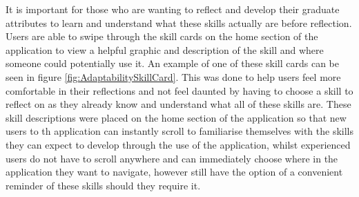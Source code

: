 \documentclass{l4proj}
\begin{document}
It is important for those who are wanting to reflect and develop their graduate attributes to learn and understand
what these skills actually are before reflection. Users are able to swipe through the skill cards on the home 
section of the application to view a helpful graphic and description of the skill and where someone could potentially 
use it. An example of one of these skill cards can be seen in figure \ref{fig:AdaptabilitySkillCard}. This was done
to help users feel more comfortable in their reflections and not feel daunted by having to choose a skill to reflect on
as they already know and understand what all of these skills are. These skill descriptions were placed on the home section
of the application so that new users to th application can instantly scroll to familiarise themselves with the skills they can 
expect to develop through the use of the application, whilst experienced users do not have to scroll anywhere and can
immediately choose where in the application they want to navigate, however still have the option of a convenient reminder 
of these skills should they require it. 
\end{document}
